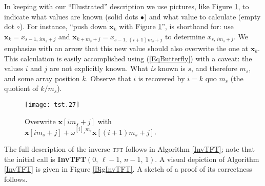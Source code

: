 \documentclass[12pt]{article}
\renewcommand{\vec}{\boldsymbol}
\theoremstyle{definition}
\newcommand{\brac}[1]{\left( #1 \right)}
\newcommand{\xx}{\boldsymbol{x}}
\newcommand{\0}{\mathbf{0}}
\theoremstyle{theorem}
\theoremstyle{definition}
\newcommand{\w}{\omega}
\begin{document}
In keeping with our ``Illustrated'' description we use pictures, like Figure \ref{PicPic},
to indicate what values are known (solid dots $\bullet$) and what value to calculate (empty dot $\circ$). For instance, ``push down $\vec{x}_k$ with Figure \ref{PicPic}'', is shorthand for: use $\xx_k = x_{s-1,\,im_s+j}$ and $\xx_{k+m_s+j}= x_{s-1,\,(i+1)m_s+j}$ to determine $x_{s,\,im_s+j}$. We emphasize with an arrow that this new value should also overwrite the one at $\xx_k$. This calculation is easily accomplished using (\ref{EqButterfly}) with a caveat: the values $i$ and $j$ are not explicitly known. What \emph{is} known is $s$, and therefore $m_s$, and some array position $k$. Observe that $i$ is recovered by $i = k \text{ quo } m_s$ (the quotient of $k/m_s$).
\begin{figure}[htp]
  \begin{center}
    \texttt{[image: tst.27]}
  \end{center}
  \caption{Overwrite $\xx[im_s+j]$ with $\xx[im_s+j] + \w^{[i]_sm_s}\xx[(i+1)m_s+j]$.}
\label{PicPic}
\end{figure}

The full description of the inverse \textsc{tft} follows in Algorithm \ref{InvTFT}; note that the initial call is {\bf InvTFT}$\brac{0,\, \ell-1 ,\, n-1,\,1}$. A visual depiction of Algorithm \ref{InvTFT} is given in Figure \ref{BigInvTFT}. A sketch of a proof of its correctness follows.



\newcommand{\head}{\text{head}}
\newcommand{\tail}{\text{tail}}
\newcommand{\last}{\text{last}}
\newcommand{\LM}{\text{LeftMiddle}}
\newcommand{\RM}{\text{RightMiddle}}
\end{document}
